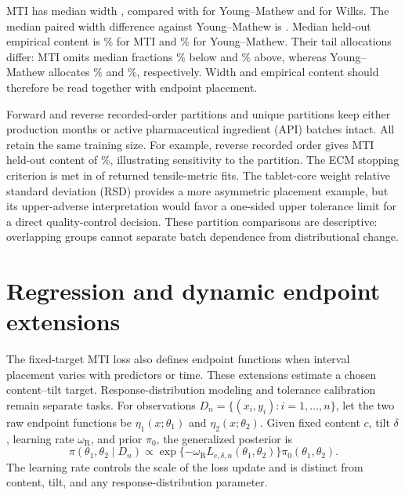 MTI has median width \PharmaTensileMtiWidth{}, compared with
\PharmaTensileYmWidth{} for Young--Mathew and \PharmaTensileWilksWidth{} for
Wilks. The median paired width difference against Young--Mathew is
\PharmaTensilePairedYmWidthDifference{}. Median held-out empirical content is
\PharmaTensileMtiContent\% for MTI and \PharmaTensileYmContent\% for
Young--Mathew. Their tail allocations differ: MTI omits median fractions
\PharmaTensileMtiLowerOmitted\% below and
\PharmaTensileMtiUpperOmitted\% above, whereas Young--Mathew allocates
\PharmaTensileYmLowerOmitted\% and \PharmaTensileYmUpperOmitted\%,
respectively. Width and empirical content should therefore be read together
with endpoint placement.

Forward and reverse recorded-order partitions and
\PharmaGroupedSplits{} unique partitions keep either production months
or active pharmaceutical ingredient (API) batches intact. All retain the same
training size. For example, reverse recorded order gives MTI held-out content
of \PharmaTensileReverseContent\%, illustrating sensitivity to the partition.
The ECM stopping criterion is met in
\PharmaTensileConverged{} of \PharmaTensileReturned{} returned tensile-metric
fits. The tablet-core weight relative standard deviation (RSD) provides a more
asymmetric placement example, but its upper-adverse interpretation would favor
a one-sided upper tolerance limit for a direct quality-control decision. These
partition comparisons are descriptive: overlapping groups cannot separate
batch dependence from distributional change.

\section{Regression and dynamic endpoint extensions}
\label{mti:sec:extensions}

The fixed-target MTI loss also defines endpoint functions when interval
placement varies with predictors or time. These extensions estimate a chosen
content--tilt target. Response-distribution modeling and tolerance calibration
remain separate tasks. For observations
\(D_n=\{(x_i,y_i):i=1,\ldots,n\}\), let the two raw endpoint functions be
\(\eta_1(x;\theta_1)\) and \(\eta_2(x;\theta_2)\). Given fixed content \(c\),
tilt \(\delta\), learning rate \(\omega_{\mathrm R}\), and prior
\(\pi_0\), the generalized posterior is
\begin{equation}
\pi(\theta_1,\theta_2\mid D_n)
\propto
\exp\{-\omega_{\mathrm R}L_{c,\delta,n}(\theta_1,\theta_2)\}
\pi_0(\theta_1,\theta_2).
\label{mti:eq:generalized-posterior}
\end{equation}
The learning rate controls the scale of the loss update and is distinct from
content, tilt, and any response-distribution parameter.

